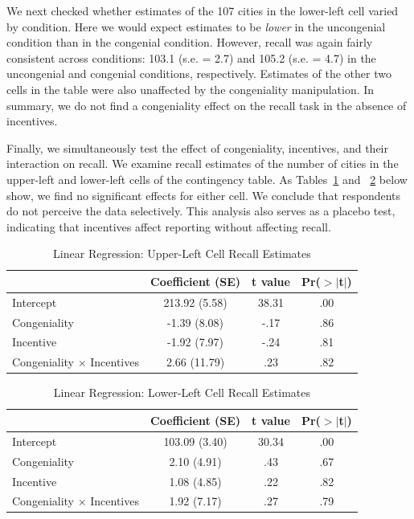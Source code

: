 \documentclass[12pt, letterpaper]{article}
\begin{document}
We next checked whether estimates of the 107 cities in the lower-left cell varied by condition. Here we would expect estimates to be {\it lower} in the uncongenial condition than in the congenial condition. However, recall was again fairly consistent across conditions: 103.1 (s.e. = 2.7) and 105.2 (s.e. = 4.7) in the uncongenial and congenial conditions, respectively. Estimates of the other two cells in the table were also unaffected by the congeniality manipulation. In summary, we do not find a congeniality effect on the recall task in the absence of incentives.

Finally, we simultaneously test the effect of congeniality, incentives, and their interaction on recall. We examine recall estimates of the number of cities in the upper-left and lower-left cells of the contingency table. As Tables~\ref{tab:recalla} and ~\ref{tab:recallc} below show, we find no significant effects for either cell. We conclude that respondents do not perceive the data selectively. This analysis also serves as a placebo test, indicating that incentives affect reporting without affecting recall.

\vspace{5mm}
\begin{table}[ht]
\centering
\caption{Linear Regression: Upper-Left Cell Recall Estimates} \label{tab:recalla}
\begin{tabular}{l c c c}
  \hline
 & Coefficient (SE) & t value & Pr($>$$|$t$|$) \\ 
  \hline
  Intercept & 213.92 (5.58) & 38.31 & .00 \\ 
  Congeniality & -1.39 (8.08) & -.17 & .86 \\ 
  Incentive & -1.92 (7.97) & -.24 & .81 \\ 
  Congeniality $\times$ Incentives & 2.66 (11.79) & .23 & .82 \\ 
   \hline
\end{tabular}
\end{table}

\begin{table}[ht]
\centering
\caption{Linear Regression: Lower-Left Cell Recall Estimates} \label{tab:recallc}
\begin{tabular}{l c c c}
  \hline
 & Coefficient (SE) & t value & Pr($>$$|$t$|$) \\ 
  \hline
  Intercept & 103.09 (3.40) & 30.34 & .00 \\ 
  Congeniality & 2.10 (4.91) & .43 & .67 \\ 
  Incentive & 1.08 (4.85) & .22 & .82 \\ 
  Congeniality $\times$ Incentives & 1.92 (7.17) & .27 & .79 \\ 
   \hline
\end{tabular}
\end{table}
\end{document}
